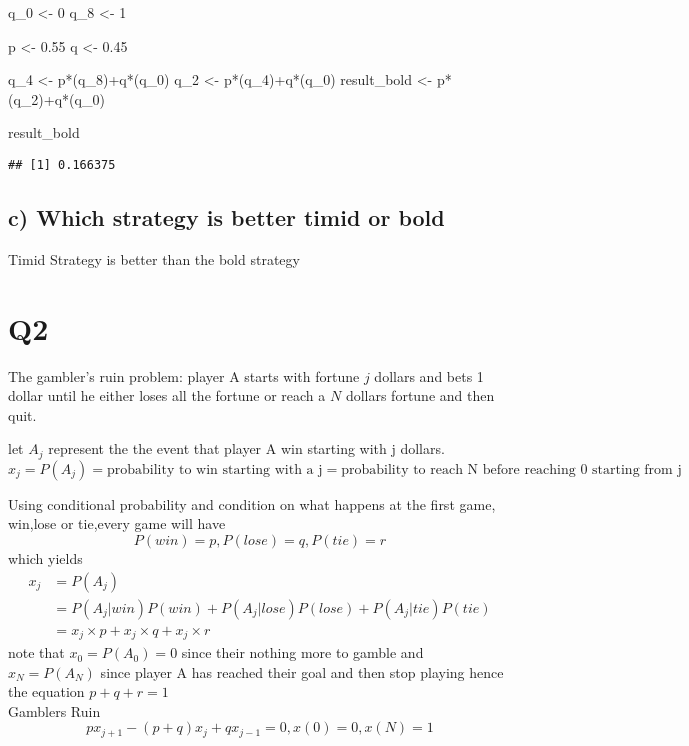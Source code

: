 \documentclass[
]{article}
\newenvironment{Shaded}{\begin{snugshade}}{\end{snugshade}}
\newcommand{\DecValTok}[1]{\textcolor[rgb]{0.00,0.00,0.81}{#1}}
\newcommand{\FloatTok}[1]{\textcolor[rgb]{0.00,0.00,0.81}{#1}}
\newcommand{\NormalTok}[1]{#1}
\newcommand{\OtherTok}[1]{\textcolor[rgb]{0.56,0.35,0.01}{#1}}
\newcommand{\SpecialCharTok}[1]{\textcolor[rgb]{0.00,0.00,0.00}{#1}}
\begin{document}
\begin{Shaded}
\begin{Highlighting}[]
\NormalTok{q\_0 }\OtherTok{\textless{}{-}} \DecValTok{0}
\NormalTok{q\_8 }\OtherTok{\textless{}{-}} \DecValTok{1}

\NormalTok{p }\OtherTok{\textless{}{-}} \FloatTok{0.55}
\NormalTok{q }\OtherTok{\textless{}{-}} \FloatTok{0.45}

\NormalTok{q\_4 }\OtherTok{\textless{}{-}}\NormalTok{ p}\SpecialCharTok{*}\NormalTok{(q\_8)}\SpecialCharTok{+}\NormalTok{q}\SpecialCharTok{*}\NormalTok{(q\_0)}
\NormalTok{q\_2 }\OtherTok{\textless{}{-}}\NormalTok{ p}\SpecialCharTok{*}\NormalTok{(q\_4)}\SpecialCharTok{+}\NormalTok{q}\SpecialCharTok{*}\NormalTok{(q\_0)}
\NormalTok{result\_bold }\OtherTok{\textless{}{-}}\NormalTok{ p}\SpecialCharTok{*}\NormalTok{(q\_2)}\SpecialCharTok{+}\NormalTok{q}\SpecialCharTok{*}\NormalTok{(q\_0)}

\NormalTok{result\_bold}
\end{Highlighting}
\end{Shaded}

\begin{verbatim}
## [1] 0.166375
\end{verbatim}

\hypertarget{c-which-strategy-is-better-timid-or-bold}{%
\subsection{c) Which strategy is better timid or
bold}\label{c-which-strategy-is-better-timid-or-bold}}

Timid Strategy is better than the bold strategy

\hypertarget{q2}{%
\section{Q2}\label{q2}}

The gambler's ruin problem: player A starts with fortune \(j\) dollars
and bets 1 dollar until he either loses all the fortune or reach a \(N\)
dollars fortune and then quit.

let \(A_j\) represent the the event that player A win starting with j
dollars.
\[ x_j = P(A_j) = \text{probability to win starting with a j} = \text{probability to reach N before reaching 0 starting from j}\]

Using conditional probability and condition on what happens at the first
game, win,lose or tie,every game will have
\[P(win)=p, P(lose)=q,P(tie)=r\] which yields
\[\begin{aligned} x_j & = P(A_j) \\ & = P(A_j|win)P(win) + P(A_j|lose)P(lose)+P(A_j|tie)P(tie) \\ & =  x_j \times p + x_j \times q + x_j \times r \end{aligned}\]
note that \(x_0 = P(A_0) = 0\) since their nothing more to gamble and
\(x_N = P(A_N)\) since player A has reached their goal and then stop
playing hence the equation \(p+q+r=1\)\\
Gamblers Ruin \[px_{j+1} - (p+q)x_j+qx_{j-1} = 0, x(0)=0,x(N)=1\]
\end{document}
